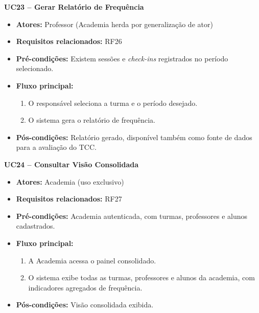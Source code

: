 \noindent\textbf{UC23 -- Gerar Relatório de Frequência}
\begin{itemize}[leftmargin=*, itemsep=0pt, topsep=2pt]
  \item \textbf{Atores:} Professor (Academia herda por generalização de ator)
  \item \textbf{Requisitos relacionados:} RF26
  \item \textbf{Pré-condições:} Existem sessões e \textit{check-ins} registrados no período selecionado.
  \item \textbf{Fluxo principal:}
  \begin{enumerate}[label=\arabic*., itemsep=0pt, topsep=0pt]
    \item O responsável seleciona a turma e o período desejado.
    \item O sistema gera o relatório de frequência.
  \end{enumerate}
  \item \textbf{Pós-condições:} Relatório gerado, disponível também como fonte de dados para a avaliação do TCC.
\end{itemize}
\medskip

\noindent\textbf{UC24 -- Consultar Visão Consolidada}
\begin{itemize}[leftmargin=*, itemsep=0pt, topsep=2pt]
  \item \textbf{Atores:} Academia (uso exclusivo)
  \item \textbf{Requisitos relacionados:} RF27
  \item \textbf{Pré-condições:} Academia autenticada, com turmas, professores e alunos cadastrados.
  \item \textbf{Fluxo principal:}
  \begin{enumerate}[label=\arabic*., itemsep=0pt, topsep=0pt]
    \item A Academia acessa o painel consolidado.
    \item O sistema exibe todas as turmas, professores e alunos da academia, com indicadores agregados de frequência.
  \end{enumerate}
  \item \textbf{Pós-condições:} Visão consolidada exibida.
\end{itemize}
\medskip

